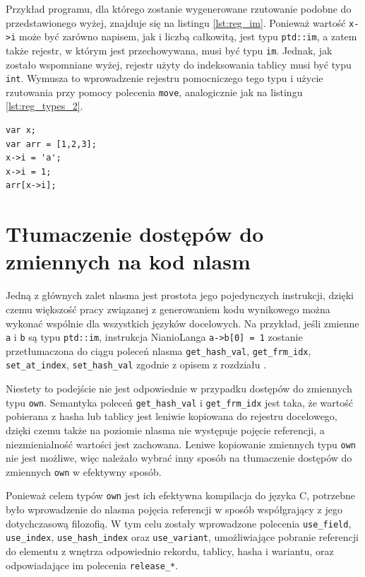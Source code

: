 \documentclass[licencjacka]{pracamgr}
\begin{document}
Przykład programu, dla którego zostanie wygenerowane rzutowanie podobne do przedstawionego wyżej,
znajduje się na listingu \ref{lst:reg_im}.
Ponieważ wartość \texttt{x->i} może być zarówno napisem, jak i liczbą całkowitą, jest typu \texttt{ptd::im},
a zatem także rejestr, w którym jest przechowywana, musi być typu \texttt{im}.
Jednak, jak zostało wspomniane wyżej, rejestr użyty do indeksowania tablicy musi być typu \texttt{int}.
Wymusza to wprowadzenie rejestru pomocniczego tego typu i użycie rzutowania przy pomocy polecenia \texttt{move},
analogicznie jak na listingu \ref{lst:reg_types_2}.
\begin{minipage}{\linewidth}
\begin{lstlisting}[caption={Indeksowanie tablicy zmienną typu \texttt{ptd::im}},label={lst:reg_im},language=nl]
var x;
var arr = [1,2,3];
x->i = 'a';
x->i = 1;
arr[x->i];
\end{lstlisting}
\end{minipage}

\section{Tłumaczenie dostępów do zmiennych na kod nlasm}
Jedną z głównych zalet nlasma jest prostota jego pojedynczych instrukcji, dzięki czemu większość
pracy związanej z generowaniem kodu wynikowego można wykonać wspólnie dla wszystkich języków docelowych.
Na przykład, jeśli zmienne \texttt{a} i \texttt{b} są typu \texttt{ptd::im}, instrukcja NianioLanga
\texttt{a->b[0] = 1} zostanie przetłumaczona do ciągu poleceń nlasma
\texttt{get\_hash\_val}, \texttt{get\_frm\_idx}, \texttt{set\_at\_index}, \texttt{set\_hash\_val} zgodnie
z opisem z rozdziału \textit{}.

Niestety to podejście nie jest odpowiednie w przypadku dostępów do zmiennych typu \texttt{own}.
Semantyka poleceń \texttt{get\_hash\_val} i \texttt{get\_frm\_idx} jest taka, że wartość pobierana
z hasha lub tablicy jest leniwie kopiowana do rejestru docelowego, dzięki czemu także na poziomie nlasma
nie występuje pojęcie referencji, a niezmienialność wartości jest zachowana.
Leniwe kopiowanie zmiennych typu \texttt{own} nie jest możliwe, więc należało wybrać inny sposób na
tłumaczenie dostępów do zmiennych \texttt{own} w efektywny sposób.

Ponieważ celem typów \texttt{own} jest ich efektywna kompilacja do języka C, potrzebne było
wprowadzenie do nlasma pojęcia referencji w sposób współgrający z jego dotychczasową filozofią.
W tym celu zostały wprowadzone polecenia \texttt{use\_field}, \texttt{use\_index}, \texttt{use\_hash\_index} oraz
\texttt{use\_variant}, umożliwiające pobranie referencji do elementu z wnętrza odpowiednio rekordu, tablicy, hasha
i wariantu, oraz odpowiadające im polecenia \texttt{release\_*}.
\end{document}
